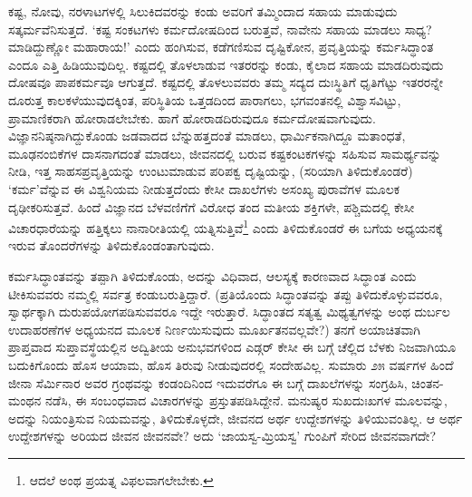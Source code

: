ಕಷ್ಟ, ನೋವು, ನರಳಾಟಗಳಲ್ಲಿ ಸಿಲುಕಿದವರನ್ನು ಕಂಡು ಅವರಿಗೆ ತಮ್ಮಿಂದಾದ ಸಹಾಯ ಮಾಡುವುದು ಸತ್ಕರ್ಮವೆನಿಸುತ್ತದೆ. ‘ಕಷ್ಟ ಸಂಕಟಗಳು ಕರ್ಮದೋಷದಿಂದ ಬರುತ್ತವೆ, ನಾವೇನು ಸಹಾಯ ಮಾಡಲು ಸಾಧ್ಯ? ಮಾಡಿದ್ದುಣ್ಣೋ ಮಹಾರಾಯ!’ ಎಂದು ಹಂಗಿಸುವ, ಕಡೆಗಣಿಸುವ ದೃಷ್ಟಿಕೋನ, ಪ್ರವೃತ್ತಿಯನ್ನು ಕರ್ಮಸಿದ್ಧಾಂತ ಎಂದೂ ಎತ್ತಿ ಹಿಡಿಯುವುದಿಲ್ಲ. ಕಷ್ಟದಲ್ಲಿ ತೊಳ\-ಲಾಡುವ ಇತರರನ್ನು ಕಂಡು, ಕೈಲಾದ ಸಹಾಯ ಮಾಡದಿರುವುದು ದೋಷವೂ ಪಾಪಕರ್ಮವೂ ಆಗುತ್ತದೆ. ಕಷ್ಟದಲ್ಲಿ ತೊಳಲುವವರು ತಮ್ಮ ಸದ್ಯದ ದುಃಸ್ಥಿತಿಗೆ ಧೃತಿಗೆಟ್ಟು ಇತರರನ್ನೇ ದೂರುತ್ತ ಕಾಲಕಳೆಯುವುದಕ್ಕಿಂತ, ಪರಿಸ್ಥಿತಿಯ ಒತ್ತಡದಿಂದ ಪಾರಾಗಲು, ಭಗವಂತನಲ್ಲಿ ವಿಶ್ವಾಸವಿಟ್ಟು, ಪ್ರಾಮಾಣಿಕರಾಗಿ ಹೋರಾಡಲೇಬೇಕು. ಹಾಗೆ ಹೋರಾಡದಿರುವುದೂ ಕರ್ಮದೋಷವಾಗುವುದು. ವಿಜ್ಞಾನನಿಷ್ಠನಾಗಿದ್ದುಕೊಂಡು ಜಡವಾದದ ಬೆನ್ನುಹತ್ತದಂತೆ ಮಾಡಲು, ಧಾರ್ಮಿಕ\-ನಾಗಿದ್ದೂ ಮತಾಂಧತೆ, ಮೂಢನಂಬಿಕೆಗಳ ದಾಸನಾಗದಂತೆ ಮಾಡಲು, ಜೀವನದಲ್ಲಿ ಬರುವ ಕಷ್ಟಕಂಟಕಗಳನ್ನು ಸಹಿಸುವ ಸಾಮರ್ಥ್ಯವನ್ನು ನೀಡಿ, ಇತ್ತ ಸಾಹಸಪ್ರವೃತ್ತಿಯನ್ನು ಉಂಟು\-ಮಾಡುವ ಪರಿಪಕ್ವ ದೃಷ್ಟಿಯನ್ನು, (ಸರಿಯಾಗಿ ತಿಳಿದುಕೊಂಡರೆ) ‘ಕರ್ಮ’ವೆನ್ನುವ ಈ ವಿಶ್ವ\-ನಿಯಮ ನೀಡುತ್ತದೆಂದು ಕೇಸೀ ದಾಖಲೆಗಳು ಅಸಂಖ್ಯ ಪುರಾವೆಗಳ ಮೂಲಕ ದೃಢೀಕರಿಸುತ್ತವೆ. ಹಿಂದೆ ವಿಜ್ಞಾನದ ಬೆಳವಣಿಗೆಗೆ ವಿರೋಧ ತಂದ ಮತೀಯ ಶಕ್ತಿಗಳೇ, ಪಶ್ಚಿಮದಲ್ಲಿ ಕೇಸೀ ವಿಚಾರಧಾರೆಯನ್ನು ಹತ್ತಿಕ್ಕಲು ನಾನಾರೀತಿಯಲ್ಲಿ ಯತ್ನಿಸುತ್ತಿವೆ\footnote{ಆದಲೆ ಅಂಥ ಪ್ರಯತ್ನ ವಿಫಲವಾಗಲೇಬೇಕು. } ಎಂದು ತಿಳಿದುಕೊಂಡರೆ ಈ ಬಗೆಯ ಅಧ್ಯಯನಕ್ಕೆ ಇರುವ ತೊಂದರೆಗಳನ್ನು ತಿಳಿದುಕೊಂಡಂತಾಗುವುದು.

ಕರ್ಮಸಿದ್ಧಾಂತವನ್ನು ತಪ್ಪಾಗಿ ತಿಳಿದುಕೊಂಡು, ಅದನ್ನು ವಿಧಿವಾದ, ಆಲಸ್ಯಕ್ಕೆ ಕಾರಣವಾದ ಸಿದ್ಧಾಂತ ಎಂದು ಟೀಕಿಸುವವರು ನಮ್ಮಲ್ಲಿ ಸರ್ವತ್ರ ಕಂಡುಬರುತ್ತಿದ್ದಾರೆ. (ಪ್ರತಿಯೊಂದು ಸಿದ್ಧಾಂತವನ್ನು ತಪ್ಪು ತಿಳಿದುಕೊಳ್ಳುವವರೂ, ಸ್ವಾರ್ಥಕ್ಕಾಗಿ ದುರುಪಯೋಗಪಡಿಸುವವರೂ ಇದ್ದೇ ಇರುತ್ತಾರೆ. ಸಿದ್ಧಾಂತದ ಸತ್ಯತ್ವ ಮಿಥ್ಯತ್ವಗಳನ್ನು ಅಂಥ ದುರ್ಬಲ ಉದಾಹರಣೆಗಳ ಅಧ್ಯಯನದ ಮೂಲಕ ನಿರ್ಣಯಿಸುವುದು ಮೂರ್ಖತನವಲ್ಲವೇ?) ತನಗೆ ಅಯಾಚಿತವಾಗಿ ಪ್ರಾಪ್ತವಾದ ಸುಪ್ತಾವಸ್ಥೆಯಲ್ಲಿನ ಅದ್ವಿತೀಯ ಅನುಭವಗಳಿಂದ ಎಡ್ಗರ್ ಕೇಸೀ ಈ ಬಗ್ಗೆ ಚೆಲ್ಲಿದ ಬೆಳಕು ನಿಜವಾಗಿಯೂ ಬದುಕಿಗೊಂದು ಹೊಸ ಆಯಾಮ, ಹೊಸ ತಿರುವು ನೀಡುವುದರಲ್ಲಿ ಸಂದೇಹವಿಲ್ಲ. ಸುಮಾರು ೨೫ ವರ್ಷಗಳ ಹಿಂದೆ ಜೀನಾ ಸೆರ್ಮಿನಾರ ಅವರ  ಗ್ರಂಥವನ್ನು ಕಂಡಂದಿನಿಂದ ಇದುವರೆಗೂ ಈ ಬಗ್ಗೆ ದಾಖಲೆಗಳನ್ನು ಸಂಗ್ರಹಿಸಿ, ಚಿಂತನ-ಮಂಥನ ನಡೆಸಿ, ಈ ಸಂಬಂಧವಾದ ವಿಚಾರಗಳನ್ನು ಪ್ರಸ್ತುತಪಡಿಸಿದ್ದೇನೆ. ಮನುಷ್ಯರ ಸುಖದುಃಖಗಳ ಮೂಲವನ್ನು, ಅದನ್ನು ನಿಯಂತ್ರಿಸುವ ನಿಯಮವನ್ನು, ತಿಳಿದುಕೊಳ್ಳದೇ, ಜೀವನದ ಅರ್ಥ ಉದ್ದೇಶಗಳನ್ನು ತಿಳಿಯುವಂತಿಲ್ಲ. ಆ ಅರ್ಥ ಉದ್ದೇಶಗಳನ್ನು ಅರಿಯದ ಜೀವನ ಜೀವನವೇ? ಅದು ‘ಜಾಯಸ್ವ-ಮ್ರಿಯಸ್ವ’ ಗುಂಪಿಗೆ ಸೇರಿದ ಜೀವನವಾಗದೇ?

